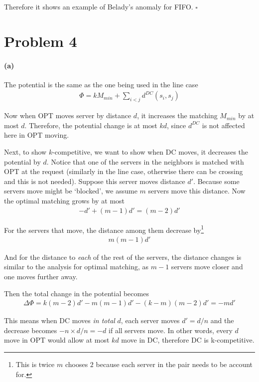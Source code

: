 \documentclass[12pt]{article}
\begin{document}
Therefore it shows an example of Belady’s anomaly for FIFO. $\square$

\pagebreak
\section*{Problem 4}
\paragraph{(a)} The potential is the same as the one being used in the line case
\begin{align*}
\Phi  = kM_{min} +  \sum_{i<j}d^{DC}(s_i, s_j)
\end{align*}

Now when OPT moves server by distance $d$, it increases the matching $M_{min}$ by at most $d$. Therefore, the potential change is at most $kd$, since $d^{DC}$ is not affected here in OPT moving.

Next, to show $k$-competitive, we want to show when DC moves, it decreases the potential by $d$. Notice that one of the servers in the neighbors is matched with OPT at the request (similarly in the line case, otherwise there can be crossing and this is not needed). Suppose this server moves distance $d'$. Because some servers move might be `blocked', we assume $m$ servers move this distance. Now the optimal matching grows by at most 
\begin{align*}
-d' + (m-1)d' = (m-2)d'
\end{align*}

For the servers that move, the distance among them decrease by\footnote{This is twice $m$ chooses $2$ because each server in the pair needs to be account for.} 
\begin{align*}
m(m-1)d'
\end{align*}

And for the distance to \emph{each} of the rest of the servers, the distance changes is similar to the analysis for optimal matching, as $m-1$ servers move closer and one moves further away. 

Then the total change in the potential becomes 
\begin{align*}
\Delta\Phi = k(m-2)d' - m(m-1)d' - (k-m)(m-2)d' = -md'
\end{align*}

This means when DC moves \emph{in total} $d$, each server moves $d'=d/n$ and the decrease becomes $-n\times d/n = -d$ if all servers move. In other words, every $d$ move in OPT would allow at most $kd$ move in DC, therefore DC is k-competitive.
\end{document}

